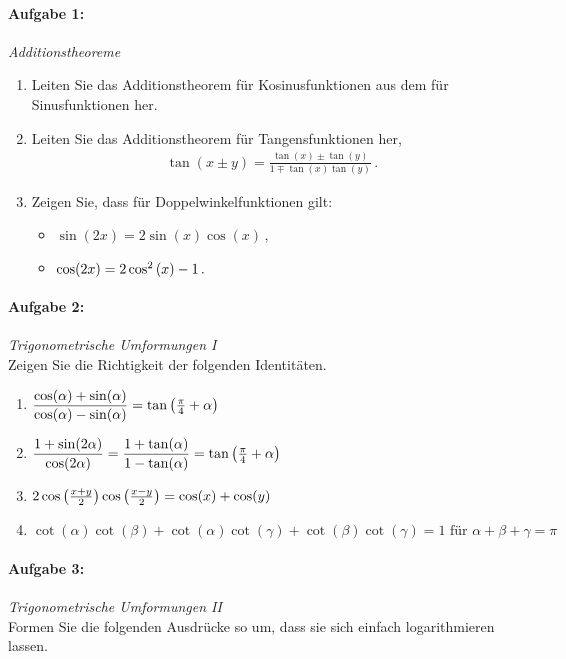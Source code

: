 
\paragraph{Aufgabe 1: } \emph{Additionstheoreme}\\[-1em]
\begin{enumerate}[label=(\alph*)]
\item Leiten Sie das Additionstheorem für Kosinusfunktionen aus dem für Sinusfunktionen her.
\item Leiten Sie das Additionstheorem für Tangensfunktionen her,
\begin{align*}
    \tan(x\pm y)=\frac{\tan(x)\pm \tan(y)}{1\mp \tan(x)\tan(y)}\,.
\end{align*}
\item Zeigen Sie, dass für Doppelwinkelfunktionen gilt:
\begin{itemize}
    \item $\sin(2x)=2\sin(x)\cos(x)\,,$
    \item $\cos(2x)=2\cos^2\qty(x)-1\,.$
\end{itemize}
\end{enumerate}

\paragraph{Aufgabe 2: } \emph{Trigonometrische Umformungen I}\\[0.2cm]
Zeigen Sie die Richtigkeit der folgenden Identitäten.
\begin{enumerate}[label=(\alph*)]
    \item $\dfrac{\cos(\alpha)+\sin(\alpha)}{\cos(\alpha)-\sin(\alpha)}=\tan\qty(\frac{\pi}{4}+\alpha)$
    \item $\dfrac{1+\sin (2\alpha)}{\cos (2\alpha)}=\dfrac{1+\tan(\alpha)}{1-\tan(\alpha)}=\tan\qty(\frac{\pi}{4}+\alpha)$
    \item $2\cos\qty(\frac{x+y}{2})\cos\qty(\frac{x-y}{2})=\cos(x)+\cos(y)$
    \item $\cot(\alpha)\cot(\beta)+\cot(\alpha)\cot(\gamma)+\cot(\beta)\cot(\gamma)=1 \text{ für } \alpha+\beta+\gamma=\pi$
\end{enumerate}

\paragraph{Aufgabe 3: } \emph{Trigonometrische Umformungen II}\\[0.2cm]
Formen Sie die folgenden Ausdrücke so um, dass sie sich einfach logarithmieren lassen.\\[-1.3em]

